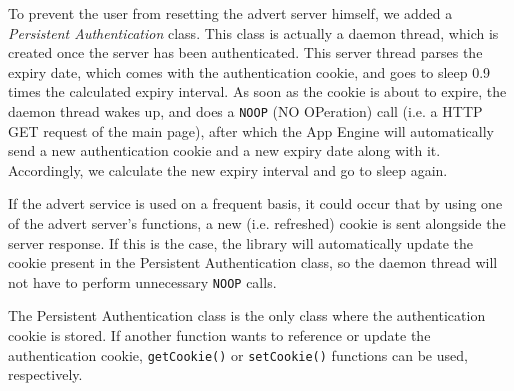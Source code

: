 To prevent the user from resetting the advert server himself, we added a
\emph{Persistent Authentication} class. This class is actually a daemon thread,
which is created once the server has been authenticated. This server thread
parses the expiry date, which comes with the authentication cookie, and goes to
sleep 0.9 times the calculated expiry interval. As soon as the cookie is about
to expire, the daemon thread wakes up, and does a \texttt{NOOP} (NO OPeration)
call (i.e. a HTTP GET request of the main page), after which the App Engine
will automatically send a new authentication cookie and a new expiry date along
with it. Accordingly, we calculate the new expiry interval and go to sleep
again.

If the advert service is used on a frequent basis, it could occur that by using
one of the advert server's functions, a new (i.e. refreshed) cookie is sent
alongside the server response. If this is the case, the library will
automatically update the cookie present in the Persistent Authentication class,
so the daemon thread will not have to perform unnecessary \texttt{NOOP} calls.

The Persistent Authentication class is the only class where the authentication
cookie is stored. If another function wants to reference or update the
authentication cookie, \texttt{getCookie()} or \texttt{setCookie()} functions
can be used, respectively.
